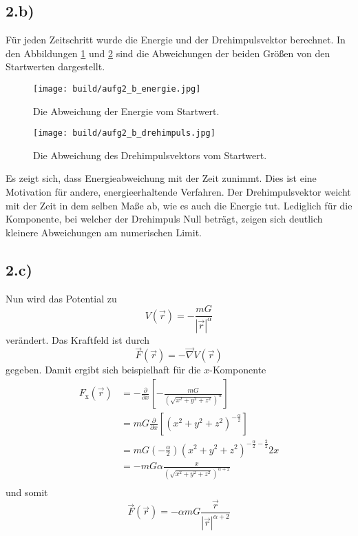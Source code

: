 \subsection*{2.b)}
Für jeden Zeitschritt wurde die Energie und der Drehimpulsvektor berechnet.
In den Abbildungen \ref{fig:2_energie} und \ref{fig:2_drehimpuls} sind die Abweichungen
der beiden Größen von den Startwerten dargestellt.
\begin{figure}
  \centering
  \texttt{[image: build/aufg2\_b\_energie.jpg]}
  \caption{Die Abweichung der Energie vom Startwert.}
  \label{fig:2_energie}
\end{figure}
\begin{figure}
  \centering
  \texttt{[image: build/aufg2\_b\_drehimpuls.jpg]}
  \caption{Die Abweichung des Drehimpulsvektors vom Startwert.}
  \label{fig:2_drehimpuls}
\end{figure}
Es zeigt sich, dass Energieabweichung mit der Zeit zunimmt. Dies ist eine Motivation für
andere, energieerhaltende Verfahren.
Der Drehimpulsvektor weicht mit der Zeit in dem selben Maße ab, wie es auch die Energie
tut. Lediglich für die Komponente, bei welcher der Drehimpuls Null beträgt, zeigen
sich deutlich kleinere Abweichungen am numerischen Limit.

\subsection*{2.c)}
Nun wird das Potential zu
\begin{equation*}
    V\!\left(\vec{r}\right) =
    - \frac{m G}{\left|\vec{r}\right|^\alpha}
\end{equation*}
verändert.
Das Kraftfeld ist durch
\begin{equation*}
    \vec{F}\!\left(\vec{r}\right)
    = - \vec{\nabla} V\!\left(\vec{r}\right)
\end{equation*}
gegeben. Damit ergibt sich beispielhaft für die $x$-Komponente
\begin{align*}
    F_\text{x}\!\left(\vec{r}\right)
    &= -\frac{\partial}{\partial x}
        \left[- \frac{m G}{\left(\sqrt{x^2 + y^2 + z^2}\right)^\alpha}\right] \\
    &= m G \frac{\partial}{\partial x}
        \left[\left(x^2 + y^2 + z^2\right)^{-\frac{\alpha}{2}}\right] \\
    &= m G \left(-\frac{\alpha}{2}\right)
        \left(x^2 + y^2 + z^2\right)^{-\frac{\alpha}{2}-\frac{2}{2}}
        2 x \\
    &= - m G \alpha
        \frac{x}{\left(\sqrt{x^2 + y^2 + z^2}\right)^{\alpha+2}} \\
\end{align*}
und somit
\begin{equation*}
    \vec{F}\!\left(\vec{r}\right)
    = -\alpha m G \frac{\vec{r}}{\left|\vec{r}\right|^{\alpha +2}}
\end{equation*}

